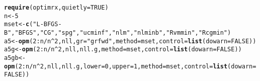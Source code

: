 \documentclass[11pt]{article}\usepackage[]{graphicx}\usepackage[]{color}
\makeatletter
\newcommand{\hlnum}[1]{\textcolor[rgb]{0.686,0.059,0.569}{#1}}%
\newcommand{\hlstr}[1]{\textcolor[rgb]{0.192,0.494,0.8}{#1}}%
\newcommand{\hlopt}[1]{\textcolor[rgb]{0,0,0}{#1}}%
\newcommand{\hlstd}[1]{\textcolor[rgb]{0.345,0.345,0.345}{#1}}%
\newcommand{\hlkwb}[1]{\textcolor[rgb]{0.69,0.353,0.396}{#1}}%
\newcommand{\hlkwc}[1]{\textcolor[rgb]{0.333,0.667,0.333}{#1}}%
\newcommand{\hlkwd}[1]{\textcolor[rgb]{0.737,0.353,0.396}{\textbf{#1}}}%
\newenvironment{kframe}{%
 \def\at@end@of@kframe{}%
 \ifinner\ifhmode%
  \def\at@end@of@kframe{\end{minipage}}%
  \begin{minipage}{\columnwidth}%
 \fi\fi%
 \def\FrameCommand##1{\hskip\@totalleftmargin \hskip-\fboxsep
 \colorbox{shadecolor}{##1}\hskip-\fboxsep
     \hskip-\linewidth \hskip-\@totalleftmargin \hskip\columnwidth}%
 \MakeFramed {\advance\hsize-\width
   \@totalleftmargin\z@ \linewidth\hsize
   \@setminipage}}%
 {\par\unskip\endMakeFramed%
 \at@end@of@kframe}
\newenvironment{knitrout}{}{} %
\makeatother
\begin{document}
\begin{knitrout}\scriptsize
{}\color{fgcolor}\begin{kframe}
\begin{alltt}
\hlkwd{require}\hlstd{(optimrx,} \hlkwc{quietly}\hlstd{=}\hlnum{TRUE}\hlstd{)}
\hlstd{n}\hlkwb{<-}\hlnum{5}
\hlstd{mset}\hlkwb{<-}\hlkwd{c}\hlstd{(}\hlstr{"L-BFGS-B"}\hlstd{,} \hlstr{"BFGS"}\hlstd{,} \hlstr{"CG"}\hlstd{,} \hlstr{"spg"}\hlstd{,} \hlstr{"ucminf"}\hlstd{,} \hlstr{"nlm"}\hlstd{,} \hlstr{"nlminb"}\hlstd{,} \hlstr{"Rvmmin"}\hlstd{,} \hlstr{"Rcgmin"}\hlstd{)}
\hlstd{a5}\hlkwb{<-}\hlkwd{opm}\hlstd{(}\hlnum{2}\hlopt{:}\hlstd{n}\hlopt{/}\hlstd{n}\hlopt{^}\hlnum{2}\hlstd{, nll,} \hlkwc{gr}\hlstd{=}\hlstr{"grfwd"}\hlstd{,} \hlkwc{method}\hlstd{=mset,} \hlkwc{control}\hlstd{=}\hlkwd{list}\hlstd{(}\hlkwc{dowarn}\hlstd{=}\hlnum{FALSE}\hlstd{))}
\hlstd{a5g}\hlkwb{<-}\hlkwd{opm}\hlstd{(}\hlnum{2}\hlopt{:}\hlstd{n}\hlopt{/}\hlstd{n}\hlopt{^}\hlnum{2}\hlstd{, nll, nll.g,} \hlkwc{method}\hlstd{=mset,} \hlkwc{control}\hlstd{=}\hlkwd{list}\hlstd{(}\hlkwc{dowarn}\hlstd{=}\hlnum{FALSE}\hlstd{))}
\hlstd{a5gb}\hlkwb{<-}\hlkwd{opm}\hlstd{(}\hlnum{2}\hlopt{:}\hlstd{n}\hlopt{/}\hlstd{n}\hlopt{^}\hlnum{2}\hlstd{, nll, nll.g,} \hlkwc{lower}\hlstd{=}\hlnum{0}\hlstd{,} \hlkwc{upper}\hlstd{=}\hlnum{1}\hlstd{,} \hlkwc{method}\hlstd{=mset,} \hlkwc{control}\hlstd{=}\hlkwd{list}\hlstd{(}\hlkwc{dowarn}\hlstd{=}\hlnum{FALSE}\hlstd{))}
\end{alltt}


{\ttfamily\noindent\color{warningcolor}{\#\# Warning in optimr(par, fn, gr, method = meth, lower = lower, upper = upper, : optimr: optim() with bounds ONLY uses L-BFGS-B}}


\end{kframe}
\end{knitrout}
\end{document}
